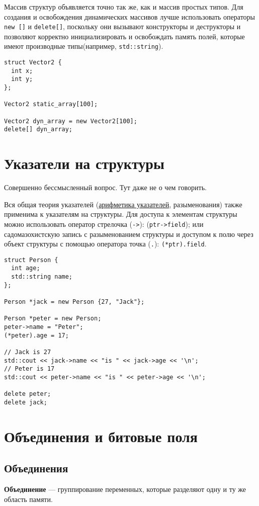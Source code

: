 Массив структур объявляется точно так же, как и массив простых типов.
Для создания и освобождения динамических массивов лучше использовать
операторы \verb|new []| и \verb|delete[]|, поскольку они вызывают
конструкторы и деструкторы и позволяют корректно инициализировать и
освобождать память полей, которые имеют производные типы(например,
\verb|std::string|).
\begin{verbatim}
struct Vector2 {
  int x;
  int y;
};

Vector2 static_array[100];

Vector2 dyn_array = new Vector2[100];
delete[] dyn_array;
\end{verbatim}

\section{Указатели на структуры}
Совершенно бессмысленный вопрос. Тут даже не о чем говорить.

Вся общая теория указателей (\hyperref[sec:ptr_arithm]{арифметика указателей}, разыменования) также
применима к указателям на структуры. Для доступа к элементам структуры можно использовать
оператор стрелочка (\verb|->|): (\verb|ptr->field|); или садомазохистскую запись с разыменованием структуры
и доступом к полю через объект структуры с помощью оператора точка (\verb|.|): \verb|(*ptr).field|.

\begin{verbatim}
struct Person {
  int age;
  std::string name;
};

Person *jack = new Person {27, "Jack"};

Person *peter = new Person;
peter->name = "Peter";
(*peter).age = 17;

// Jack is 27
std::cout << jack->name << "is " << jack->age << '\n';
// Peter is 17
std::cout << peter->name << "is " << peter->age << '\n';

delete peter;
delete jack;
\end{verbatim}

\section{Объединения и битовые поля}
\subsection*{Объединения}
\textbf{Объединение} --- группирование переменных, которые разделяют одну и ту же область памяти.

